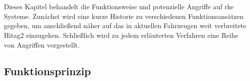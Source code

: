 \chapter{}

Dieses Kapitel behandelt die Funktionsweise und potenzielle Angriffe auf \gls{rke} Systeme. Zunächst wird eine kurze Historie zu verschiedenen Funktionsansätzen gegeben, um anschließend näher auf das in aktuellen Fahrzeugen weit verbreitete Hitag2 einzugehen. Schließlich wird zu jedem erläuterten Verfahren eine Reihe von Angriffen vorgestellt.

\section{Funktionsprinzip}

